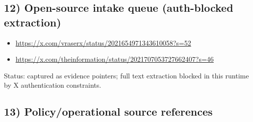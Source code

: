 \documentclass[11pt]{article}
\begin{document}
\hypertarget{open-source-intake-queue-auth-blocked-extraction}{%
\subsection{12) Open-source intake queue (auth-blocked
extraction)}\label{open-source-intake-queue-auth-blocked-extraction}}

\begin{itemize}
\tightlist
\item
  \url{https://x.com/vraserx/status/2021654971343610058?s=52}
\item
  \url{https://x.com/theinformation/status/2021707053727662407?s=46}
\end{itemize}

Status: captured as evidence pointers; full text extraction blocked in
this runtime by X authentication constraints.

\hypertarget{policyoperational-source-references}{%
\subsection{13) Policy/operational source
references}\label{policyoperational-source-references}}
\end{document}
